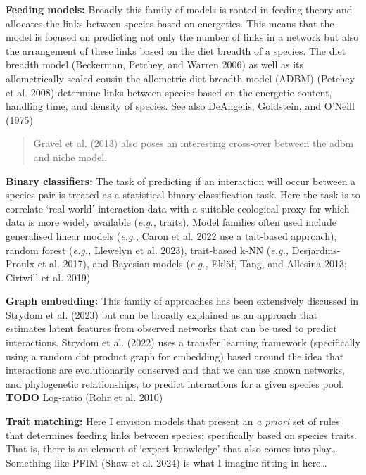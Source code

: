 \documentclass[
  letterpaper,
  DIV=11,
  numbers=noendperiod]{scrartcl}
\begin{document}
\textbf{Feeding models:} Broadly this family of models is rooted in
feeding theory and allocates the links between species based on
energetics. This means that the model is focused on predicting not only
the number of links in a network but also the arrangement of these links
based on the diet breadth of a species. The diet breadth model
(Beckerman, Petchey, and Warren 2006) as well as its allometrically
scaled cousin the allometric diet breadth model (ADBM) (Petchey et al.
2008) determine links between species based on the energetic content,
handling time, and density of species. See also DeAngelis, Goldstein,
and O'Neill (1975)

\begin{quote}
Gravel et al. (2013) also poses an interesting cross-over between the
adbm and niche model.
\end{quote}

\textbf{Binary classifiers:} The task of predicting if an interaction
will occur between a species pair is treated as a statistical binary
classification task. Here the task is to correlate `real world'
interaction data with a suitable ecological proxy for which data is more
widely available (\emph{e.g.,} traits). Model families often used
include generalised linear models (\emph{e.g.,} Caron et al. 2022 use a
tait-based approach), random forest (\emph{e.g.,} Llewelyn et al. 2023),
trait-based k-NN (\emph{e.g.,} Desjardins-Proulx et al. 2017), and
Bayesian models (\emph{e.g.,} Eklöf, Tang, and Allesina 2013; Cirtwill
et al. 2019)

\textbf{Graph embedding:} This family of approaches has been extensively
discussed in Strydom et al. (2023) but can be broadly explained as an
approach that estimates latent features from observed networks that can
be used to predict interactions. Strydom et al. (2022) uses a transfer
learning framework (specifically using a random dot product graph for
embedding) based around the idea that interactions are evolutionarily
conserved and that we can use known networks, and phylogenetic
relationships, to predict interactions for a given species pool.
\textbf{TODO} Log-ratio (Rohr et al. 2010)

\textbf{Trait matching:} Here I envision models that present an \emph{a
priori} set of rules that determines feeding links between species;
specifically based on species traits. That is, there is an element of
`expert knowledge' that also comes into play\ldots{} Something like PFIM
(Shaw et al. 2024) is what I imagine fitting in here\ldots{}
\end{document}
